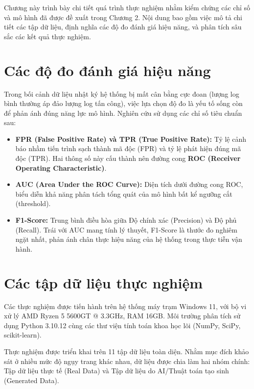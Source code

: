 \documentclass[../main.tex]{subfiles}
\begin{document}
Chương này trình bày chi tiết quá trình thực nghiệm nhằm kiểm chứng các chỉ số và mô hình đã được đề xuất trong Chương 2. Nội dung bao gồm việc mô tả chi tiết các tập dữ liệu, định nghĩa các độ đo đánh giá hiệu năng, và phân tích sâu sắc các kết quả thực nghiệm.

\section{Các độ đo đánh giá hiệu năng}
\label{section:3.0}
Trong bối cảnh dữ liệu nhật ký hệ thống bị mất cân bằng cực đoan (lượng log bình thường áp đảo lượng log tấn công), việc lựa chọn độ đo là yếu tố sống còn để phản ánh đúng năng lực mô hình. Nghiên cứu sử dụng các chỉ số tiêu chuẩn sau:
\begin{itemize}
    \item \textbf{FPR (False Positive Rate) và TPR (True Positive Rate):} Tỷ lệ cảnh báo nhầm tiến trình sạch thành mã độc (FPR) và tỷ lệ phát hiện đúng mã độc (TPR). Hai thông số này cấu thành nên đường cong \textbf{ROC (Receiver Operating Characteristic)}.
    \item \textbf{AUC (Area Under the ROC Curve):} Diện tích dưới đường cong ROC, biểu diễn khả năng phân tách tổng quát của mô hình bất kể ngưỡng cắt (threshold).
    \item \textbf{F1-Score:} Trung bình điều hòa giữa Độ chính xác (Precision) và Độ phủ (Recall). Trái với AUC mang tính lý thuyết, F1-Score là thước đo nghiêm ngặt nhất, phản ánh chân thực hiệu năng của hệ thống trong thực tiễn vận hành.
\end{itemize}

\section{Các tập dữ liệu thực nghiệm}
\label{section:3.1}

Các thực nghiệm được tiến hành trên hệ thống máy trạm Windows 11, với bộ vi xử lý AMD Ryzen 5 5600GT @ 3.3GHz, RAM 16GB. Môi trường phân tích sử dụng Python 3.10.12 cùng các thư viện tính toán khoa học lõi (NumPy, SciPy, scikit-learn).

Thực nghiệm được triển khai trên 11 tập dữ liệu toàn diện. Nhằm mục đích khảo sát ở nhiều mức độ ngụy trang khác nhau, dữ liệu được chia làm hai nhóm chính: Tập dữ liệu thực tế (Real Data) và Tập dữ liệu do AI/Thuật toán tạo sinh (Generated Data). 
\end{document}
